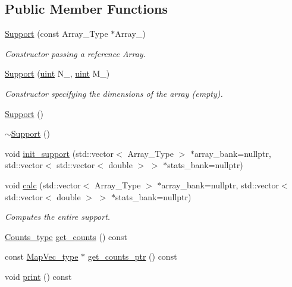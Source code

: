 \subsection*{Public Member Functions}
\begin{DoxyCompactItemize}
\item 
\hyperlink{classbarry_1_1_support_ab34144acc225be907c1403b06573b016}{Support} (const Array\+\_\+\+Type $\ast$Array\+\_\+)
\begin{DoxyCompactList}\small\item\em Constructor passing a reference Array. \end{DoxyCompactList}\item 
\hyperlink{classbarry_1_1_support_a0deea9b8e83fd418dfad59fb4cfb2ad5}{Support} (\hyperlink{namespacebarry_a11dfc53ddb4672278319aa04f1e09a6c}{uint} N\+\_\+, \hyperlink{namespacebarry_a11dfc53ddb4672278319aa04f1e09a6c}{uint} M\+\_\+)
\begin{DoxyCompactList}\small\item\em Constructor specifying the dimensions of the array (empty). \end{DoxyCompactList}\item 
\hyperlink{classbarry_1_1_support_a08a48546e91c5259a26be4cde31ef902}{Support} ()
\item 
\hyperlink{classbarry_1_1_support_a4ea99cc1691b04b76a333e851aab4b64}{$\sim$\+Support} ()
\item 
void \hyperlink{classbarry_1_1_support_a013872a55ffd6a0a931e124da8e8dc99}{init\+\_\+support} (std\+::vector$<$ Array\+\_\+\+Type $>$ $\ast$array\+\_\+bank=nullptr, std\+::vector$<$ std\+::vector$<$ double $>$ $>$ $\ast$stats\+\_\+bank=nullptr)
\item 
void \hyperlink{classbarry_1_1_support_afa36b8c1348e28c51296379157f58081}{calc} (std\+::vector$<$ Array\+\_\+\+Type $>$ $\ast$array\+\_\+bank=nullptr, std\+::vector$<$ std\+::vector$<$ double $>$ $>$ $\ast$stats\+\_\+bank=nullptr)
\begin{DoxyCompactList}\small\item\em Computes the entire support. \end{DoxyCompactList}\item 
\hyperlink{namespacebarry_a3e2d8c3b6cf602107559d4237d9f1315}{Counts\+\_\+type} \hyperlink{classbarry_1_1_support_a5d93a94eaed9b1157fb934284883fd47}{get\+\_\+counts} () const
\item 
const \hyperlink{namespacebarry_a2f0d3aab1d67e4c8eaeab9022e16139f}{Map\+Vec\+\_\+type} $\ast$ \hyperlink{classbarry_1_1_support_abcb4dea3c5a1b140990821900432f90e}{get\+\_\+counts\+\_\+ptr} () const
\item 
void \hyperlink{classbarry_1_1_support_af87b2e85ec72e394387946023508e7fd}{print} () const
\end{DoxyCompactItemize}
